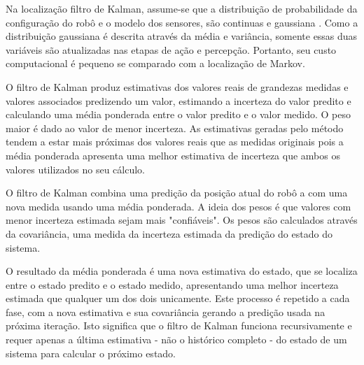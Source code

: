  
 Na localização filtro de Kalman, assume-se que a distribuição de probabilidade da configuração do robô e o modelo dos sensores,
 são continuas e gaussiana \cite{localization2}. Como a distribuição gaussiana é descrita através da média e variância, somente essas duas variáveis 
 são atualizadas nas etapas de ação e percepção. Portanto, seu custo computacional é pequeno se comparado com a localização de Markov.
 
O filtro de Kalman produz estimativas dos valores reais de grandezas medidas e valores associados predizendo um valor, 
estimando a incerteza do valor predito e calculando uma média ponderada entre o valor predito e o valor medido. 
O peso maior é dado ao valor de menor incerteza. As estimativas geradas pelo método tendem a estar mais próximas dos 
valores reais que as medidas originais pois a média ponderada apresenta uma melhor estimativa de incerteza que ambos os valores utilizados no seu cálculo.

 
  
O filtro de Kalman combina uma predição da posição atual do robô a com uma nova medida usando uma média ponderada. 
A ideia dos pesos é que valores com menor incerteza estimada sejam mais "confiáveis". 
Os pesos são calculados através da covariância, uma medida da incerteza estimada da predição do estado do sistema. 

O resultado da média ponderada é uma nova estimativa do estado, que se localiza entre o estado predito e o estado medido, 
apresentando uma melhor incerteza estimada que qualquer um dos dois unicamente. 
Este processo é repetido a cada fase, com a nova estimativa e sua covariância gerando a predição usada na próxima iteração. 
Isto significa que o filtro de Kalman funciona recursivamente e requer apenas a 
última estimativa - não o histórico completo - do estado de um sistema para calcular o próximo estado.

